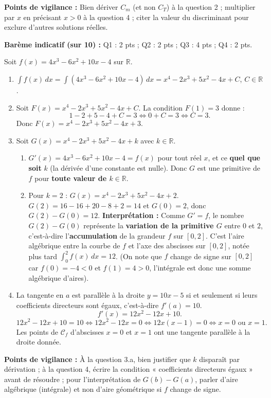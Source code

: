 \documentclass[11pt]{article}
\begin{document}
\begin{corrige}
\textbf{Points de vigilance :} Bien dériver $C_m$ (et non $C_T$) à la question 2 ; multiplier par $x$ en précisant $x>0$ à la question 4 ; citer la valeur du discriminant pour exclure d'autres solutions réelles.
\end{corrige}

\begin{corrige}
\textbf{Barème indicatif (sur 10) :} Q1 : 2 pts ; Q2 : 2 pts ; Q3 : 4 pts ; Q4 : 2 pts.

Soit $f(x)=4x^3-6x^2+10x-4$ sur $\mathbb{R}$.
\begin{enumerate}
    \item $\displaystyle\int f(x)\,dx=\int(4x^3-6x^2+10x-4)\,dx=x^4-2x^3+5x^2-4x+C$, $C\in\mathbb{R}$.
    \item Soit $F(x)=x^4-2x^3+5x^2-4x+C$. La condition $F(1)=3$ donne :
    \[ 1-2+5-4+C=3 \iff 0+C=3 \iff C=3. \]
    Donc $F(x)=x^4-2x^3+5x^2-4x+3$.
    \item Soit $G(x)=x^4-2x^3+5x^2-4x+k$ avec $k\in\mathbb{R}$.
    \begin{enumerate}
        \item $G'(x)=4x^3-6x^2+10x-4=f(x)$ pour tout réel $x$, et ce \textbf{quel que soit} $k$ (la dérivée d'une constante est nulle). Donc $G$ est une primitive de $f$ pour \textbf{toute valeur de $k\in\mathbb{R}$}.
        \item Pour $k=2$ : $G(x)=x^4-2x^3+5x^2-4x+2$.
        $G(2)=16-16+20-8+2=14$ et $G(0)=2$, donc $G(2)-G(0)=12$.
        \textbf{Interprétation :} Comme $G'=f$, le nombre $G(2)-G(0)$ représente la \textbf{variation de la primitive $G$} entre $0$ et $2$, c'est-à-dire l'\textbf{accumulation} de la grandeur $f$ sur $[0,2]$. C'est l'aire algébrique entre la courbe de $f$ et l'axe des abscisses sur $[0,2]$, notée plus tard $\displaystyle\int_0^2 f(x)\,dx=12$. (On note que $f$ change de signe sur $[0,2]$ car $f(0)=-4<0$ et $f(1)=4>0$, l'intégrale est donc une somme algébrique d'aires).
    \end{enumerate}
    \item La tangente en $a$ est parallèle à la droite $y=10x-5$ si et seulement si leurs coefficients directeurs sont égaux, c'est-à-dire $f'(a)=10$.
    \[ f'(x)=12x^2-12x+10. \]
    \[ 12x^2-12x+10=10 \iff 12x^2-12x=0 \iff 12x(x-1)=0 \iff x=0 \text{ ou } x=1. \]
    Les points de $\mathcal{C}_f$ d'abscisses $x=0$ et $x=1$ ont une tangente parallèle à la droite donnée.
\end{enumerate}

\textbf{Points de vigilance :} À la question 3.a, bien justifier que $k$ disparaît par dérivation ; à la question 4, écrire la condition « coefficients directeurs égaux » avant de résoudre ; pour l'interprétation de $G(b)-G(a)$, parler d'aire algébrique (intégrale) et non d'aire géométrique si $f$ change de signe.
\end{corrige}
\end{document}
